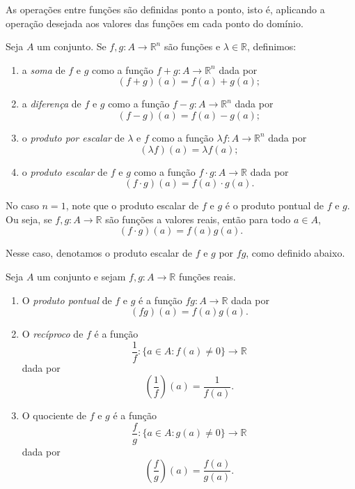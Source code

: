 As operações entre funções são definidas ponto a ponto, isto é, aplicando a operação desejada aos valores das funções em cada ponto do domínio.

\begin{definition}
    Seja $A$ um conjunto.
    Se $f,g:A\to\mathbb R^n$ são funções e $\lambda\in\mathbb R$, definimos:
    \begin{enumerate}[label=(\alph*)]
        \item a \emph{soma} de $f$ e $g$ como a função $f+g:A\to\mathbb R^n$ dada por
        \[
            (f+g)(a)=f(a)+g(a);
        \]
        \item a \emph{diferença} de $f$ e $g$ como a função $f-g:A\to\mathbb R^n$ dada por
        \[
            (f-g)(a)=f(a)-g(a);
        \]
        \item o \emph{produto por escalar} de $\lambda$ e $f$ como a função $\lambda f:A\to\mathbb R^n$ dada por
        \[
            (\lambda f)(a)=\lambda f(a);
        \]
        \item o \emph{produto escalar} de $f$ e $g$ como a função $f\cdot g:A\to\mathbb R$ dada por
        \[
            (f\cdot g)(a)=f(a)\cdot g(a).
        \]
    \end{enumerate}
\end{definition}

No caso $n=1$, note que o produto escalar de $f$ e $g$ é o produto pontual de $f$ e $g$.
Ou seja, se $f, g: A\to \mathbb R$ são funções a valores reais, então para todo $a\in A$,
\[
    (f\cdot g)(a)=f(a)g(a).
\]

Nesse caso, denotamos o produto escalar de $f$ e $g$ por $fg$, como definido abaixo.

\begin{definition}
    Seja $A$ um conjunto e sejam $f,g:A\to\mathbb R$ funções reais.
    \begin{enumerate}[label=(\alph*)]
        \item O \emph{produto pontual} de $f$ e $g$ é a função $fg:A\to\mathbb R$ dada por
        \[
            (fg)(a)=f(a)g(a).
        \]
        \item O \emph{recíproco} de $f$ é a função
        \[
            \frac{1}{f}:\{a\in A:f(a)\neq 0\}\to\mathbb R
        \]
        dada por
        \[
            \left(\frac{1}{f}\right)(a)=\frac{1}{f(a)}.
        \]
        \item O quociente de $f$ e $g$ é a função
        \[
            \frac{f}{g}:\{a\in A:g(a)\neq 0\}\to\mathbb R
        \]
        dada por
        \[
            \left(\frac{f}{g}\right)(a)=\frac{f(a)}{g(a)}.
        \]
    \end{enumerate}
\end{definition}

